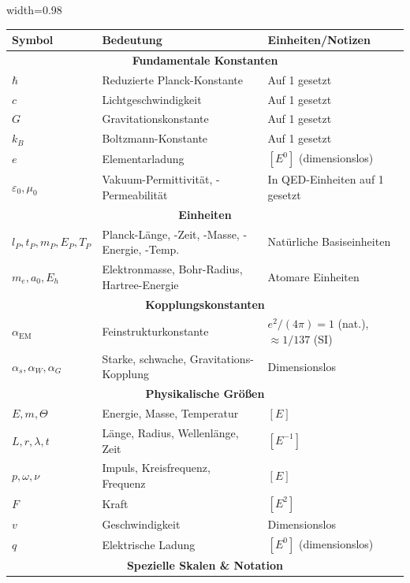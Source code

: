 	{\small
		\begin{table}[htbp]
			\centering
			\begin{adjustbox}{width=0.98\textwidth}
				\begin{tabular}{lll}
					\toprule
					\textbf{Symbol} & \textbf{Bedeutung} & \textbf{Einheiten/Notizen} \\
					\midrule
					\multicolumn{3}{c}{\textbf{Fundamentale Konstanten}} \\
					$\hbar$ & Reduzierte Planck-Konstante & Auf 1 gesetzt \\
					$c$ & Lichtgeschwindigkeit & Auf 1 gesetzt \\
					$G$ & Gravitationskonstante & Auf 1 gesetzt \\
					$k_B$ & Boltzmann-Konstante & Auf 1 gesetzt \\
					$e$ & Elementarladung & $[E^0]$ (dimensionslos) \\
					$\varepsilon_0, \mu_0$ & Vakuum-Permittivität, -Permeabilität & In QED-Einheiten auf 1 gesetzt \\
					\midrule
					\multicolumn{3}{c}{\textbf{Einheiten}} \\
					$l_P, t_P, m_P, E_P, T_P$ & Planck-Länge, -Zeit, -Masse, -Energie, -Temp. & Natürliche Basiseinheiten \\
					$m_e, a_0, E_h$ & Elektronmasse, Bohr-Radius, Hartree-Energie & Atomare Einheiten \\
					\midrule
					\multicolumn{3}{c}{\textbf{Kopplungskonstanten}} \\
					$\alpha_{\text{EM}}$ & Feinstrukturkonstante & $e^2/(4\pi) = 1$ (nat.), $\approx 1/137$ (SI) \\
					$\alpha_s, \alpha_W, \alpha_G$ & Starke, schwache, Gravitations-Kopplung & Dimensionslos \\
					\midrule
					\multicolumn{3}{c}{\textbf{Physikalische Größen}} \\
					$E, m, \Theta$ & Energie, Masse, Temperatur & $[E]$ \\
					$L, r, \lambda, t$ & Länge, Radius, Wellenlänge, Zeit & $[E^{-1}]$ \\
					$p, \omega, \nu$ & Impuls, Kreisfrequenz, Frequenz & $[E]$ \\
					$F$ & Kraft & $[E^2]$ \\
					$v$ & Geschwindigkeit & Dimensionslos \\
					$q$ & Elektrische Ladung & $[E^0]$ (dimensionslos) \\
					\midrule
					\multicolumn{3}{c}{\textbf{Spezielle Skalen \& Notation}} \\

\end{tabular}
\end{adjustbox}
\end{table}}
